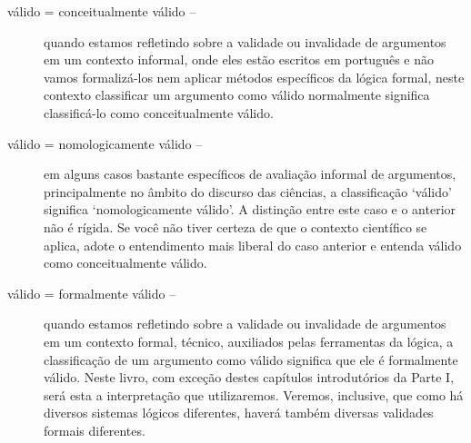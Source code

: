\begin{description}
	\item[válido = conceitualmente válido --] quando estamos refletindo sobre a validade ou invalidade de argumentos em um contexto informal, onde eles estão escritos em português e não vamos formalizá-los nem aplicar métodos específicos da lógica formal, neste contexto classificar um argumento como válido normalmente significa classificá-lo como conceitualmente válido.
	\item[válido = nomologicamente válido --] em alguns casos bastante específicos de avaliação informal de argumentos, principalmente no âmbito do discurso das ciências, a classificação `válido' significa `nomologicamente válido'.
	A distinção entre este caso e o anterior não é rígida.
	Se você não tiver certeza de que o contexto científico se aplica, adote o entendimento mais liberal do caso anterior e entenda válido como conceitualmente válido.
	\item[válido = formalmente válido --] quando estamos refletindo sobre a validade ou invalidade de argumentos em um contexto formal, técnico, auxiliados pelas ferramentas da lógica, a classificação de um argumento como válido significa que ele é formalmente válido.
	Neste livro, com exceção destes capítulos introdutórios da Parte I, será esta a interpretação que utilizaremos.
	Veremos, inclusive, que como há diversos sistemas lógicos diferentes, haverá também diversas validades formais diferentes.
\end{description}


